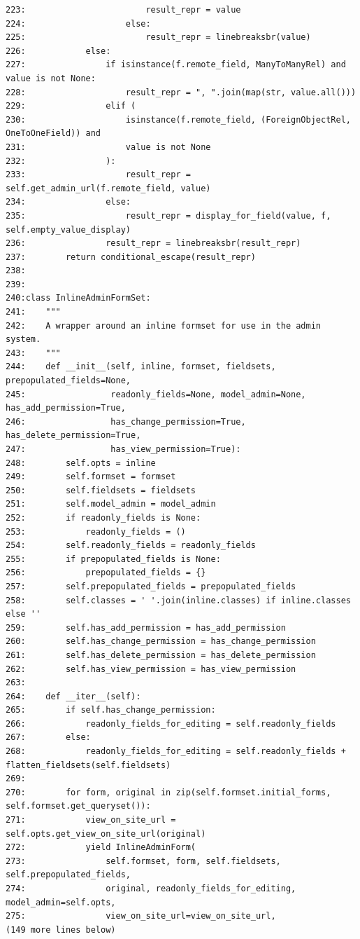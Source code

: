 {\begin{observationbox}
\begin{Verbatim}[breaklines=true, breakanywhere=true]
223:                        result_repr = value
224:                    else:
225:                        result_repr = linebreaksbr(value)
226:            else:
227:                if isinstance(f.remote_field, ManyToManyRel) and value is not None:
228:                    result_repr = ", ".join(map(str, value.all()))
229:                elif (
230:                    isinstance(f.remote_field, (ForeignObjectRel, OneToOneField)) and
231:                    value is not None
232:                ):
233:                    result_repr = self.get_admin_url(f.remote_field, value)
234:                else:
235:                    result_repr = display_for_field(value, f, self.empty_value_display)
236:                result_repr = linebreaksbr(result_repr)
237:        return conditional_escape(result_repr)
238:
239:
240:class InlineAdminFormSet:
241:    """
242:    A wrapper around an inline formset for use in the admin system.
243:    """
244:    def __init__(self, inline, formset, fieldsets, prepopulated_fields=None,
245:                 readonly_fields=None, model_admin=None, has_add_permission=True,
246:                 has_change_permission=True, has_delete_permission=True,
247:                 has_view_permission=True):
248:        self.opts = inline
249:        self.formset = formset
250:        self.fieldsets = fieldsets
251:        self.model_admin = model_admin
252:        if readonly_fields is None:
253:            readonly_fields = ()
254:        self.readonly_fields = readonly_fields
255:        if prepopulated_fields is None:
256:            prepopulated_fields = {}
257:        self.prepopulated_fields = prepopulated_fields
258:        self.classes = ' '.join(inline.classes) if inline.classes else ''
259:        self.has_add_permission = has_add_permission
260:        self.has_change_permission = has_change_permission
261:        self.has_delete_permission = has_delete_permission
262:        self.has_view_permission = has_view_permission
263:
264:    def __iter__(self):
265:        if self.has_change_permission:
266:            readonly_fields_for_editing = self.readonly_fields
267:        else:
268:            readonly_fields_for_editing = self.readonly_fields + flatten_fieldsets(self.fieldsets)
269:
270:        for form, original in zip(self.formset.initial_forms, self.formset.get_queryset()):
271:            view_on_site_url = self.opts.get_view_on_site_url(original)
272:            yield InlineAdminForm(
273:                self.formset, form, self.fieldsets, self.prepopulated_fields,
274:                original, readonly_fields_for_editing, model_admin=self.opts,
275:                view_on_site_url=view_on_site_url,
(149 more lines below)


\end{Verbatim}
\end{observationbox}}
